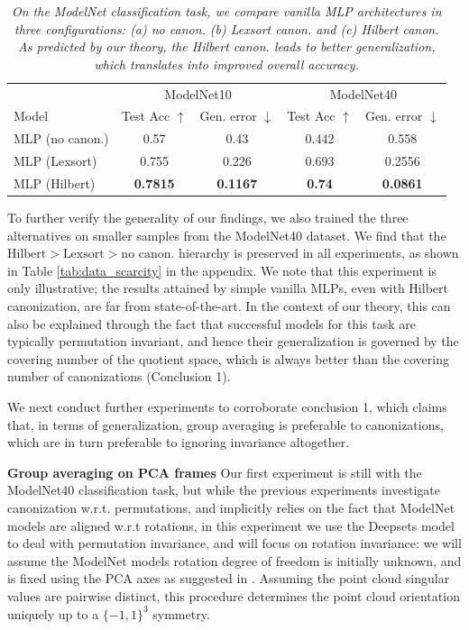 \documentclass{article}
\begin{document}
\begin{table}[h]
\centering
\caption{\it On the ModelNet classification task, we compare vanilla MLP architectures in three configurations: (a) no canon. (b) Lexsort canon. and (c) Hilbert canon. As predicted by our theory, the Hilbert canon. leads to better generalization, which translates into improved overall accuracy.}
\label{tab:best_modelnet10and40}
\begin{tabular}{lcccc}
\hline
 & \multicolumn{2}{c}{ModelNet10} & \multicolumn{2}{c}{ModelNet40} \\
Model & Test Acc $\uparrow$ & Gen. error $\downarrow$ & Test Acc $\uparrow$ & Gen. error $\downarrow$ \\
\hline
MLP (no canon.)  & 0.57 & 0.43 & 0.442 & 0.558 \\
MLP (Lexsort)    & 0.755 & 0.226 & 0.693 & 0.2556 \\
MLP (Hilbert)    & \textbf{0.7815} & \textbf{0.1167} & \textbf{0.74} & \textbf{0.0861} \\
\hline
\end{tabular}
\end{table}

To further verify the generality of our findings, we also trained the three alternatives on smaller samples from the ModelNet40 dataset. We find that the $\text{Hilbert}>\text{Lexsort}>\text{no canon.}$ hierarchy is preserved in all experiments, as shown in Table \ref{tab:data_scarcity} in the appendix. 
We note that this experiment is only illustrative; the results attained by simple vanilla MLPs, even with Hilbert canonization, are far from state-of-the-art. In the context of our theory, this can also be explained through the fact that successful models for this task are typically permutation invariant, and hence their generalization is governed by the covering number of the quotient space, which is always better than the covering number of canonizations (Conclusion 1).

We next conduct further experiments to corroborate conclusion 1, which claims that, in terms of generalization, group averaging is preferable to canonizations, which are in turn preferable to ignoring invariance altogether.

\textbf{Group averaging on PCA frames} Our first experiment is still with the ModelNet40 classification task, but while the previous experiments investigate canonization w.r.t. permutations, and implicitly relies on the fact that ModelNet models are aligned w.r.t rotations, in this experiment we use the  Deepsets \cite{zaheer2017deep} model to deal with permutation invariance, and will focus on rotation invariance: we will assume the ModelNet models rotation degree of freedom is initially unknown, and is fixed using the PCA axes as suggested in \cite{punyframe}. Assuming the point cloud singular values are pairwise distinct, this procedure determines the point cloud orientation uniquely up to a $\{-1,1\}^3$ symmetry.
\end{document}
